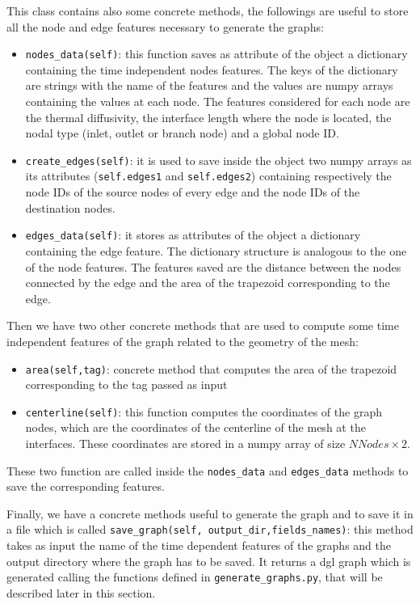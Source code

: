 \documentclass[11pt,a4paper]{article}
\begin{document}
This class contains also some concrete methods, the followings are useful to store all the node and edge features necessary to generate the graphs:
\begin{itemize}
    \item \texttt{nodes\_data(self)}: this function saves as attribute of the object a dictionary containing the time independent nodes features. The keys of the dictionary are strings with the name of the features and the values are numpy arrays containing the values at each node. The features considered for each node are the thermal diffusivity, the interface length where the node is located, the nodal type (inlet, outlet or branch node) and a global node ID.
    \item \texttt{create\_edges(self)}: it is used to save inside the object two numpy arrays as its attributes (\texttt{self.edges1} and \texttt{self.edges2}) containing respectively the node IDs of the source nodes of every edge and the node IDs of the destination nodes.
    \item \texttt{edges\_data(self)}: it stores as attributes of the object a dictionary containing the edge feature. The dictionary structure is analogous to the one of the node features. The features saved are the distance between the nodes connected by the edge and the area of the trapezoid corresponding to the edge.
\end{itemize}

Then we have two other concrete methods that are used to compute some time independent features of the graph related to the geometry of the mesh:
\begin{itemize}
    \item \texttt{area(self,tag)}: concrete method that computes the area of the trapezoid corresponding to the tag passed as input 
    \item \texttt{centerline(self)}: this function computes the coordinates of the graph nodes, which are the coordinates of the centerline of the mesh at the interfaces. These coordinates are stored in a numpy array of size \(NNodes \times 2\).
\end{itemize}
These two function are called inside the \texttt{nodes\_data} and \texttt{edges\_data} methods to save the corresponding features.

Finally, we have a concrete methods useful to generate the graph and to save it in a file which is called \texttt{save\_graph(self, output\_dir,fields\_names)}: this method takes as input the name of the time dependent features of the graphs and the output directory where the graph has to be saved. It returns a dgl graph which is generated calling the functions defined in \texttt{generate\_graphs.py}, that will be described later in this section. 
\end{document}
